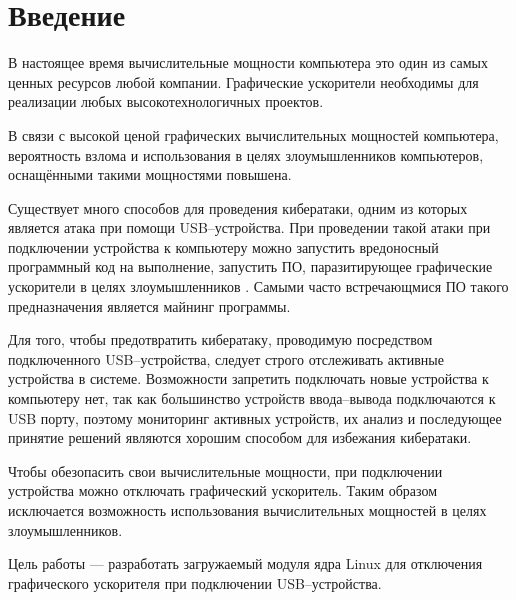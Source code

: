 \chapter*{Введение}

В настоящее время вычислительные мощности компьютера это один из самых ценных ресурсов любой компании. Графические ускорители необходимы для реализации любых высокотехнологичных проектов.

В связи с высокой ценой графических вычислительных мощностей компьютера, вероятность взлома и использования в целях злоумышленников компьютеров, оснащёнными такими мощностями повышена. 

Существует много способов для проведения кибератаки, одним из которых является атака при помощи USB--устройства. При проведении такой атаки при подключении устройства к компьютеру можно запустить вредоносный программный код на выполнение, запустить ПО, паразитирующее графические ускорители в целях злоумышленников \cite{usbmalware}. Самыми часто встречающмися ПО такого предназначения является майнинг программы.

Для того, чтобы предотвратить кибератаку, проводимую посредством подключенного USB--устройства, следует строго отслеживать активные устройства в системе. Возможности запретить подключать новые устройства к компьютеру нет, так как большинство устройств ввода--вывода подключаются к USB порту, поэтому мониторинг активных устройств, их анализ и последующее принятие решений являются хорошим способом для избежания кибератаки.

Чтобы обезопасить свои вычислительные мощности, при подключении устройства можно отключать графический ускоритель. Таким образом исключается возможность использования вычислительных мощностей в целях злоумышленников.

Цель работы --- разработать загружаемый модуля ядра Linux для отключения графического ускорителя при подключении USB--устройства.